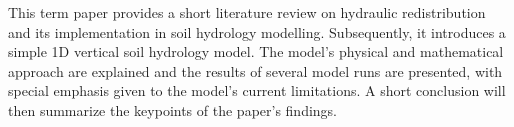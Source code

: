 This term paper provides a short literature review on hydraulic redistribution and its implementation in soil hydrology modelling.
Subsequently, it introduces a simple 1D vertical soil hydrology model.
The model’s physical and mathematical approach are explained and the results of several model runs are presented, with special emphasis given to the model’s current limitations.
A short conclusion will then summarize the keypoints of the paper’s findings.

